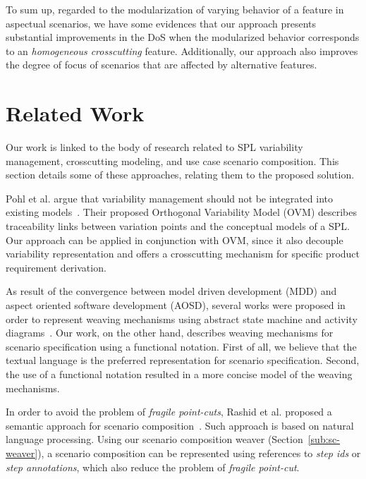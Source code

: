 \documentclass{acm_proc_article-sp}
\begin{document}
To sum up, regarded to the modularization of
varying behavior of a feature in aspectual scenarios, we have some evidences
that our approach presents substantial improvements in the DoS when the
modularized behavior corresponds to an \emph{homogeneous crosscutting} feature. Additionally,
our approach also improves the degree of focus of scenarios that are affected
by alternative features. 




\section{Related Work}
\label{sec:related}

Our work is linked to the body of research related to SPL
variability management, crosscutting modeling, and use case scenario
composition. This section details some of these approaches, relating
them to the proposed solution.

Pohl et al. argue that variability management should not be
integrated into existing models~\cite{phol-spl-book}. Their proposed
Orthogonal Variability Model (OVM) describes traceability links
between variation points and the conceptual models of a SPL. Our
approach can be applied in conjunction with OVM, since it also
decouple variability representation and offers a crosscutting
mechanism for specific product requirement derivation.

As result of the convergence between model driven development (MDD)
and aspect oriented software development (AOSD), several works were
proposed in order to represent weaving mechanisms using abstract
state machine and activity
diagrams~\cite{noda-aom-2006,thomas-aom-2006}. Our work, on the
other hand, describes weaving mechanisms for scenario specification
using a functional notation. First of all, we believe that the
textual language is the preferred representation for scenario
specification. Second, the use of a functional notation resulted in
a more concise model of the weaving mechanisms.

In order to avoid the problem of \emph{fragile point-cuts}, Rashid
et al. proposed a semantic approach for scenario
composition~\cite{rashid-aosd-2007}. Such approach is based on
natural language processing. Using our scenario composition weaver
(Section~\ref{sub:sc-weaver}), a scenario composition can be
represented using references to \emph{step ids} or \emph{step annotations},
which also reduce the problem of \emph{fragile point-cut}.
\end{document}
